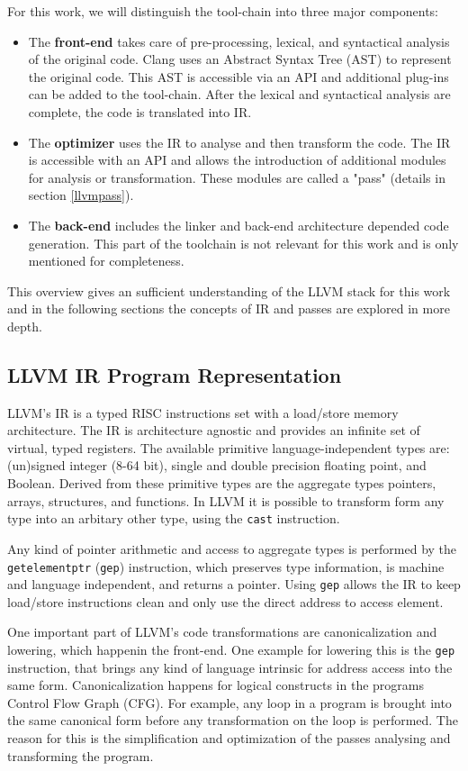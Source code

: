 For this work, we will distinguish the tool-chain into three major components:
\begin{itemize}
	\item The \textbf{front-end} takes care of pre-processing, lexical, and syntactical analysis of the original code. Clang uses an Abstract Syntax Tree (AST) to represent the original code. This AST is accessible via an API and additional plug-ins can be added to the tool-chain. After the lexical and syntactical analysis are complete, the code is translated into IR. 
	\item The \textbf{optimizer} uses the IR to analyse and then transform the code. The IR is accessible with an API and allows the introduction of additional modules for analysis or transformation. These modules are called a "pass" (details in section \ref{llvmpass}).
	\item The \textbf{back-end} includes the linker and back-end architecture depended code generation. This part of the
	toolchain is not relevant for this work and is only mentioned for completeness.
\end{itemize}
This overview gives an sufficient understanding of the LLVM stack for this work and in the following sections
the concepts of IR and passes are explored in more depth.

\subsection{LLVM IR Program Representation} \label{llvmir}
LLVM's IR is a typed RISC instructions set with a load/store memory architecture. The IR is architecture agnostic and provides an infinite set of virtual, typed registers. The available primitive language-independent types are: (un)signed integer (8-64 bit), single and double precision floating point, and Boolean. Derived from these primitive types are the aggregate types pointers, arrays, structures, and functions. In LLVM it is possible to transform form any type into an arbitary other type, using the \verb|cast| instruction. 

Any kind of pointer arithmetic and access to aggregate types is performed by the \verb|getelementptr| (\verb|gep|) instruction, which preserves type information, is machine and language independent, and returns a pointer. Using \verb|gep| allows the IR to keep load/store instructions clean and only use the direct address to access element.

One important part of LLVM's code transformations are canonicalization and lowering, which happenin the front-end. One example for lowering this is the \verb|gep| instruction, that brings any kind of language intrinsic for address access into the same form. Canonicalization happens for logical constructs in the programs Control Flow Graph (CFG). For example, any loop in a program is brought into the same canonical form before any transformation on the loop is performed.
The reason for this is the simplification and optimization of the passes analysing and transforming the program.  
